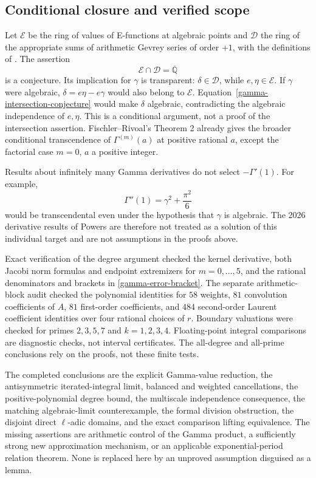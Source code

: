 \documentclass[11pt,a4paper]{article}
\theoremstyle{definition}
\theoremstyle{remark}
\numberwithin{equation}{section}
\begin{document}
\subsection{Conditional closure and verified scope}
\label{gamma-scope}

Let $\mathcal E$ be the ring of values of E-functions at algebraic
points and $\mathcal D$ the ring of the appropriate sums of arithmetic
Gevrey series of order $+1$, with the definitions of
\cite{gamma-Gevrey}. The assertion
\begin{equation}
 \mathcal E\cap\mathcal D=\overline{\mathbb Q}
 \label{gamma-intersection-conjecture}
\end{equation}
is a conjecture. Its implication for $\gamma$ is transparent:
$\delta\in\mathcal D$, while $e,\eta\in\mathcal E$. If $\gamma$
were algebraic, $\delta=e\eta-e\gamma$ would also belong to
$\mathcal E$. Equation~\eqref{gamma-intersection-conjecture} would
make $\delta$ algebraic, contradicting the algebraic independence of
$e,\eta$. This is a conditional argument, not a proof of the
intersection assertion. Fischler--Rivoal's Theorem 2 already gives
the broader conditional transcendence of $\Gamma^{(m)}(a)$ at
positive rational $a$, except the factorial case $m=0$, $a$ a
positive integer.

Results about infinitely many Gamma derivatives do not select
$-\Gamma'(1)$. For example,
\[
 \Gamma''(1)=\gamma^2+\frac{\pi^2}{6}
\]
would be transcendental even under the hypothesis that $\gamma$ is
algebraic. The 2026 derivative results of Powers
\cite{gamma-Powers} are therefore not treated as a solution of this
individual target and are not assumptions in the proofs above.

Exact verification of the degree argument checked the kernel
derivative, both Jacobi norm formulas and endpoint extremizers for
$m=0,\ldots,5$, and the rational denominators and brackets in
\eqref{gamma-error-bracket}. The separate arithmetic-block audit
checked the polynomial identities for $58$ weights, $81$ convolution
coefficients of $A$, $81$ first-order coefficients, and $484$
second-order Laurent coefficient identities over four rational
choices of $r$. Boundary valuations were checked for primes
$2,3,5,7$ and $k=1,2,3,4$. Floating-point integral comparisons are
diagnostic checks, not interval certificates. The all-degree and
all-prime conclusions rely on the proofs, not these finite tests.

The completed conclusions are the explicit Gamma-value reduction,
the antisymmetric iterated-integral limit, balanced and weighted
cancellations, the positive-polynomial degree
bound, the multiscale independence consequence, the matching
algebraic-limit counterexample, the formal division obstruction,
the disjoint direct $\ell$-adic domains, and the exact comparison
lifting equivalence. The missing assertions are arithmetic control
of the Gamma product, a sufficiently strong new approximation
mechanism, or an applicable exponential-period relation theorem.
None is replaced here by an unproved assumption disguised as a lemma.
\end{document}
